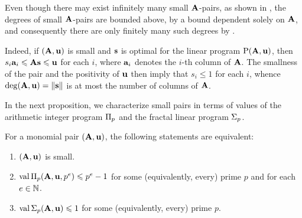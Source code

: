 \documentclass{article}
\begin{document}
\begin{remark}
   \label{rem: finitely many F-thresholds of small pairs}
   Even though there may exist infinitely many small $\mathbf{A}$-pairs, as shown in , the degrees of small $\mathbf{A}$-pairs are bounded above, by a bound dependent solely on $\mathbf{A}$, and consequently there are only finitely many such degrees by .
   

   Indeed, if $(\mathbf{A},\mathbf{u})$ is small and $\mathbf{s}$ is optimal for the linear program $\mathrm{P}(\mathbf{A},\mathbf{u})$, then $s_i\mathbf{a}_i \leqslant \mathbf{A}\mathbf{s} \leqslant \mathbf{u}$ for each $i$, where $\mathbf{a}_i$ denotes the $i$-th column of $\mathbf{A}$.
   The smallness of the pair and the positivity of $\mathbf{u}$ then imply that $s_i \le 1$ for each $i$, whence $\operatorname{deg}(\mathbf{A},\mathbf{u}) = \| \mathbf{s} \|$ is at most the number of columns of $\mathbf{A}$. 
\end{remark}

In the next proposition, we characterize small pairs in terms of values of the arithmetic integer program $\Pi_p$ and the fractal linear program $\Sigma_p$.

\begin{proposition}
   \label{trivial small value bound: P}
   For a monomial pair $(\mathbf{A},\mathbf{u})$, the following statements are equivalent\textup:   
   \begin{enumerate}[$(1)$]
      \item $(\mathbf{A}, \mathbf{u})$ is small.
      \item $\operatorname{val} \Pi_p(\mathbf{A}, \mathbf{u}, p^e) \leqslant p^e-1$ for some \textup(equivalently, every\textup) prime $p$ and for each $e\in \mathbb{N}$.
      \item $\operatorname{val} \Sigma_p(\mathbf{A},\mathbf{u}) \leqslant 1$ for some \textup(equivalently, every\textup) prime $p$.
   \end{enumerate}
\end{proposition}
\end{document}
